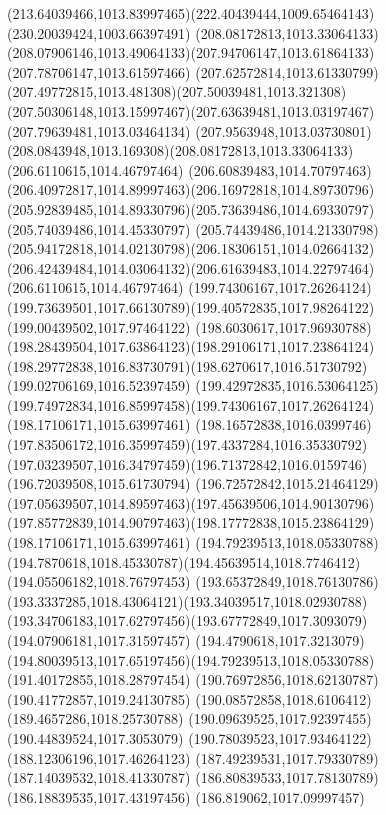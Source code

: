 {{\curveto(213.64039466,1013.83997465)(222.40439444,1009.65464143)(230.20039424,1003.66397491)
\moveto(208.08172813,1013.33064133)
\curveto(208.07906146,1013.49064133)(207.94706147,1013.61864133)(207.78706147,1013.61597466)
\curveto(207.62572814,1013.61330799)(207.49772815,1013.481308)(207.50039481,1013.321308)
\curveto(207.50306148,1013.15997467)(207.63639481,1013.03197467)(207.79639481,1013.03464134)
\curveto(207.9563948,1013.03730801)(208.0843948,1013.169308)(208.08172813,1013.33064133)
\moveto(206.6110615,1014.46797464)
\curveto(206.60839483,1014.70797463)(206.40972817,1014.89997463)(206.16972818,1014.89730796)
\curveto(205.92839485,1014.89330796)(205.73639486,1014.69330797)(205.74039486,1014.45330797)
\curveto(205.74439486,1014.21330798)(205.94172818,1014.02130798)(206.18306151,1014.02664132)
\curveto(206.42439484,1014.03064132)(206.61639483,1014.22797464)(206.6110615,1014.46797464)
\moveto(199.74306167,1017.26264124)
\curveto(199.73639501,1017.66130789)(199.40572835,1017.98264122)(199.00439502,1017.97464122)
\curveto(198.6030617,1017.96930788)(198.28439504,1017.63864123)(198.29106171,1017.23864124)
\curveto(198.29772838,1016.83730791)(198.6270617,1016.51730792)(199.02706169,1016.52397459)
\curveto(199.42972835,1016.53064125)(199.74972834,1016.85997458)(199.74306167,1017.26264124)
\moveto(198.17106171,1015.63997461)
\curveto(198.16572838,1016.0399746)(197.83506172,1016.35997459)(197.4337284,1016.35330792)
\curveto(197.03239507,1016.34797459)(196.71372842,1016.0159746)(196.72039508,1015.61730794)
\curveto(196.72572842,1015.21464129)(197.05639507,1014.89597463)(197.45639506,1014.90130796)
\curveto(197.85772839,1014.90797463)(198.17772838,1015.23864129)(198.17106171,1015.63997461)
\moveto(194.79239513,1018.05330788)
\curveto(194.7870618,1018.45330787)(194.45639514,1018.7746412)(194.05506182,1018.76797453)
\curveto(193.65372849,1018.76130786)(193.3337285,1018.43064121)(193.34039517,1018.02930788)
\curveto(193.34706183,1017.62797456)(193.67772849,1017.3093079)(194.07906181,1017.31597457)
\curveto(194.4790618,1017.3213079)(194.80039513,1017.65197456)(194.79239513,1018.05330788)
\moveto(191.40172855,1018.28797454)
\lineto(190.76972856,1018.62130787)
\lineto(190.41772857,1019.24130785)
\lineto(190.08572858,1018.6106412)
\lineto(189.4657286,1018.25730788)
\lineto(190.09639525,1017.92397455)
\lineto(190.44839524,1017.3053079)
\lineto(190.78039523,1017.93464122)
\closepath
\moveto(188.12306196,1017.46264123)
\lineto(187.49239531,1017.79330789)
\lineto(187.14039532,1018.41330787)
\lineto(186.80839533,1017.78130789)
\lineto(186.18839535,1017.43197456)
\lineto(186.819062,1017.09997457)
}}
